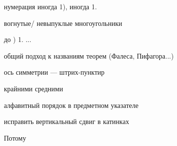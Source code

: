 

















нумерация иногда 1), иногда 1.




вогнутые/ невыпуклые многоугольники 

\smallskip до ) 1. ...

общий подход к названиям теорем (Фалеса, Пифагора...)

ось симметрии --- штрих-пунктир




крайними средними




алфавитный порядок в предметном указателе

исправить вертикальный сдвиг в катинках

Потому